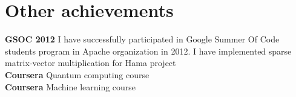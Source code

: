 \documentclass{article}
\begin{document}
\section*{Other achievements}
\textbf{GSOC 2012} I have successfully participated in Google Summer Of Code students program in Apache organization in 2012. I have implemented sparse matrix-vector multiplication for Hama project\\
\textbf{Coursera} Quantum computing course\\
\textbf{Coursera} Machine learning course
\end{document}
